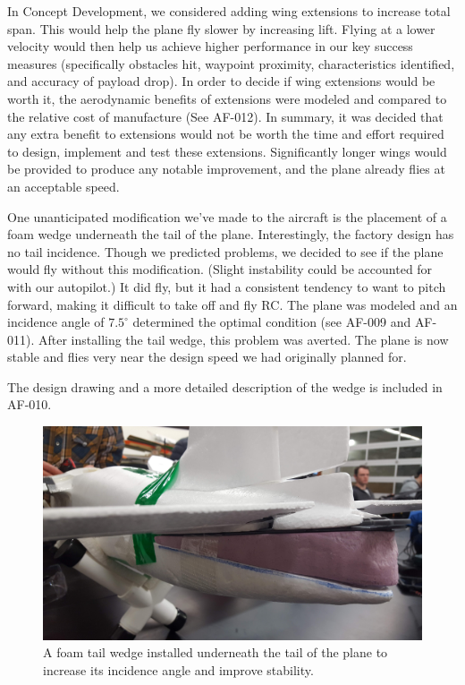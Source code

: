 \documentclass[]{auvsi_doc}
\begin{document}
In Concept Development, we considered adding wing extensions to increase total span. This would help the plane fly slower by increasing lift. Flying at a lower velocity would then help us achieve higher performance in our key success measures (specifically obstacles hit, waypoint proximity, characteristics identified, and accuracy of payload drop). In order to decide if wing extensions would be worth it, the aerodynamic benefits of extensions were modeled and compared to the relative cost of manufacture (See AF-012). In summary, it was decided that any extra benefit to extensions would not be worth the time and effort required to design, implement and test these extensions. Significantly longer wings would be provided to produce any notable improvement, and the plane already flies at an acceptable speed.

One unanticipated modification we've made to the aircraft is the placement of a foam wedge underneath the tail of the plane. Interestingly, the factory design has no tail incidence. Though we predicted problems, we decided to see if the plane would fly without this modification. (Slight instability could be accounted for with our autopilot.) It did fly, but it had a consistent tendency to want to pitch forward, making it difficult to take off and fly RC. The plane was modeled and an incidence angle of $7.5^\circ$ determined the optimal condition (see AF-009 and AF-011). After installing the tail wedge, this problem was averted. The plane is now stable and flies very near the design speed we had originally planned for.

The design drawing and a more detailed description of the wedge is included in AF-010.

\begin{figure}[h!]
	\centering
	\includegraphics[width=.75\columnwidth]{figs/tailwedge}
	\caption{A foam tail wedge installed underneath the tail of the plane to increase its incidence angle and improve stability.}
	\label{fig:wedge}
\end{figure}
\end{document}

